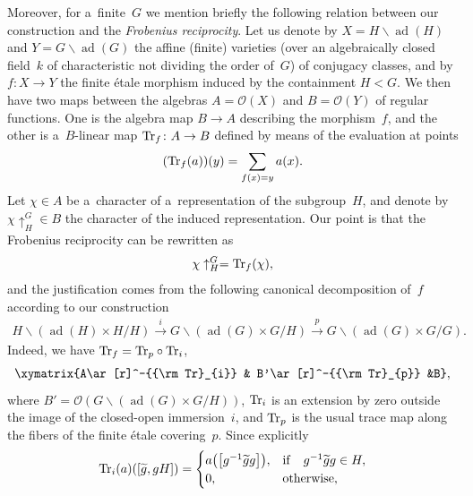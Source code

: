 \documentclass[pdftex]{sigma}
\numberwithin{equation}{section}
\DeclareMathOperator{\ad}{ad}
\begin{document}
Moreover, for a~f\/inite~$G$ we mention brief\/ly the following relation between our construction and the \emph{Frobenius
reciprocity}.
Let us denote by $X=H\backslash \ad(H)$ and $Y=G\backslash \ad(G)$ the af\/f\/ine (f\/inite) varieties (over an
algebraically closed f\/ield~$k$ of characteristic not dividing the order of~$G$) of conjugacy classes, and by $f\colon
X\rightarrow Y$ the f\/inite \'{e}tale morphism induced by the containment $H<G$.
We then have two maps between the algebras $A={\mathscr O}(X)$ and $B={\mathscr O}(Y)$ of regular functions.
One is the algebra map $B\rightarrow A$ describing the morphism~$f$, and the other is a~$B$-linear map ${\rm Tr}_{f}\colon
A\rightarrow B$ def\/ined by means of the evaluation at points
\begin{gather*}%
({\rm Tr}_{f}(a))(y)=\sum\limits_{f(x)=y}a(x).
\end{gather*}
Let $\chi\in A$ be a~character of a~representation of the subgroup~$H$, and denote by $\chi\uparrow^{G}_{H}\in B$ the
character of the induced representation.
Our point is that the Frobenius reciprocity can be rewritten as
\begin{gather}
\label{frob-rec}
\chi\uparrow^{G}_{H}={\rm Tr}_{f}(\chi),
\end{gather}
and the justif\/ication comes from the following canonical decomposition of~$f$ according to our construction
\begin{gather*}%
H\backslash (\ad(H)\times H/H)\stackrel{i}{\rightarrow} G\backslash (\ad(G)\times
G/H)\stackrel{p}{\rightarrow} G\backslash (\ad(G)\times G/G).
\end{gather*}
Indeed, we have ${\rm Tr}_{f}={\rm Tr}_{p}\circ {\rm Tr}_{i}$,
\begin{gather*}
\xymatrix{A\ar[r]^-{{\rm Tr}_{i}} & B'\ar[r]^-{{\rm Tr}_{p}} &B},
\end{gather*}
where $B'={\mathscr O}(G\backslash (\ad(G)\times G/H))$, ${\rm Tr}_{i}$ is an extension by zero outside the image
of the closed-open immersion~$i$, and ${\rm Tr}_{p}$ is the usual trace map along the f\/ibers of the f\/inite \'{e}tale
covering~$p$.
Since explicitly
\begin{gather*}%
{\rm Tr}_{i}(a)([\widetilde{g}, gH])=\begin{cases}
a\big(\big[g^{-1}\widetilde{g}g\big]\big), & {\rm if}\quad g^{-1}\widetilde{g}g\in H,
\\
0, &{\rm otherwise},
\end{cases}
\end{gather*}
\end{document}
